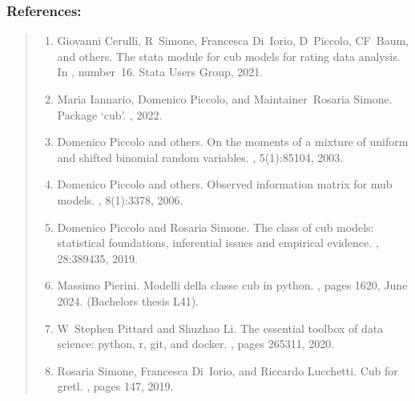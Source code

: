 \documentclass[letterpaper,10pt,english]{sphinxmanual}
\begin{document}
\subsubsection{References:}
\label{\detokenize{cubmods:id158}}\begin{quote}
\begin{enumerate}
%
\setcounter{enumi}{0}
\item {} 
\sphinxAtStartPar
Giovanni Cerulli, R Simone, Francesca Di Iorio, D Piccolo, CF Baum, and others. The stata module for cub models for rating data analysis. In , number 16. Stata Users Group, 2021.

\item {} 
\sphinxAtStartPar
Maria Iannario, Domenico Piccolo, and Maintainer Rosaria Simone. Package ‘cub’. , 2022.

\item {} 
\sphinxAtStartPar
Domenico Piccolo and others. On the moments of a mixture of uniform and shifted binomial random variables. , 5(1):85\textendash{}104, 2003.

\item {} 
\sphinxAtStartPar
Domenico Piccolo and others. Observed information matrix for mub models. , 8(1):33\textendash{}78, 2006.

\item {} 
\sphinxAtStartPar
Domenico Piccolo and Rosaria Simone. The class of cub models: statistical foundations, inferential issues and empirical evidence. , 28:389\textendash{}435, 2019.

\item {} 
\sphinxAtStartPar
Massimo Pierini. Modelli della classe cub in python. , pages 16\textendash{}20, June 2024. (Bachelor\textquotesingle{}s thesis L\sphinxhyphen{}41).

\item {} 
\sphinxAtStartPar
W Stephen Pittard and Shuzhao Li. The essential toolbox of data science: python, r, git, and docker. , pages 265\textendash{}311, 2020.

\item {} 
\sphinxAtStartPar
Rosaria Simone, Francesca Di Iorio, and Riccardo Lucchetti. Cub for gretl. , pages 147, 2019.

\end{enumerate}
\end{quote}
\end{document}

